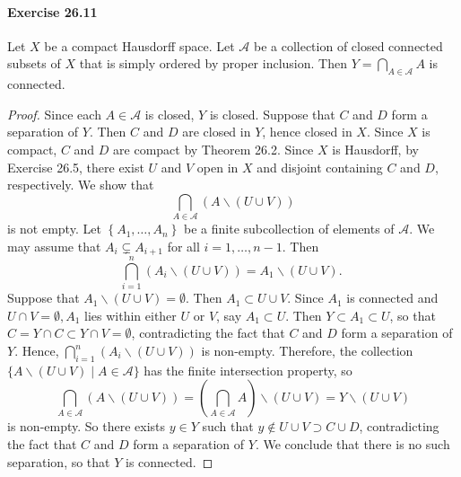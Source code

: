 \documentclass{article}
\begin{document}
\paragraph{Exercise 26.11} Let $X$ be a compact Hausdorff space. Let $\mathcal{A}$ be a collection of closed connected subsets of $X$ that is simply ordered by proper inclusion. Then $Y=\bigcap_{A \in \mathcal{A}} A$ is connected.
\begin{proof}
 Since each $A \in \mathcal{A}$ is closed, $Y$ is closed. Suppose that $C$ and $D$ form a separation of $Y$. Then $C$ and $D$ are closed in $Y$, hence closed in $X$. Since $X$ is compact, $C$ and $D$ are compact by Theorem 26.2. Since $X$ is Hausdorff, by Exercise 26.5, there exist $U$ and $V$ open in $X$ and disjoint containing $C$ and $D$, respectively. We show that
$$
\bigcap_{A \in \mathcal{A}}(A \backslash(U \cup V))
$$
is not empty. Let $\left\{A_1, \ldots, A_n\right\}$ be a finite subcollection of elements of $\mathcal{A}$. We may assume that $A_i \subsetneq A_{i+1}$ for all $i=1, \ldots, n-1$. Then
$$
\bigcap_{i=1}^n\left(A_i \backslash(U \cup V)\right)=A_1 \backslash(U \cup V) \text {. }
$$
Suppose that $A_1 \backslash(U \cup V)=\emptyset$. Then $A_1 \subset U \cup V$. Since $A_1$ is connected and $U \cap V=\emptyset, A_1$ lies within either $U$ or $V$, say $A_1 \subset U$. Then $Y \subset A_1 \subset U$, so that $C=Y \cap C \subset Y \cap V=\emptyset$, contradicting the fact that $C$ and $D$ form a separation of $Y$. Hence, $\bigcap_{i=1}^n\left(A_i \backslash(U \cup V)\right)$ is non-empty. Therefore, the collection $\{A \backslash(U \cup V) \mid A \in \mathcal{A}\}$ has the finite intersection property, so
$$
\bigcap_{A \in \mathcal{A}}(A \backslash(U \cup V))=\left(\bigcap_{A \in \mathcal{A}} A\right) \backslash(U \cup V)=Y \backslash(U \cup V)
$$
is non-empty. So there exists $y \in Y$ such that $y \notin U \cup V \supset C \cup D$, contradicting the fact that $C$ and $D$ form a separation of $Y$. We conclude that there is no such separation, so that $Y$ is connected.
\end{proof}
\end{document}
